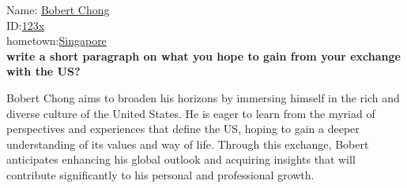 \documentclass[11pt]{article}
\begin{document}

\vspace{0.5cm}

Name: \underline{Bobert Chong\hspace{2.3in}} \\
ID:\underline{123x\hspace{2.65in}}\\
hometown:\underline{Singapore\hspace{2.45in}}\\
\textbf{write a short paragraph on what you hope to gain from your exchange with the US?}

Bobert Chong aims to broaden his horizons by immersing himself in the rich and diverse culture of the United States. He is eager to learn from the myriad of perspectives and experiences that define the US, hoping to gain a deeper understanding of its values and way of life. Through this exchange, Bobert anticipates enhancing his global outlook and acquiring insights that will contribute significantly to his personal and professional growth.
\end{document}
